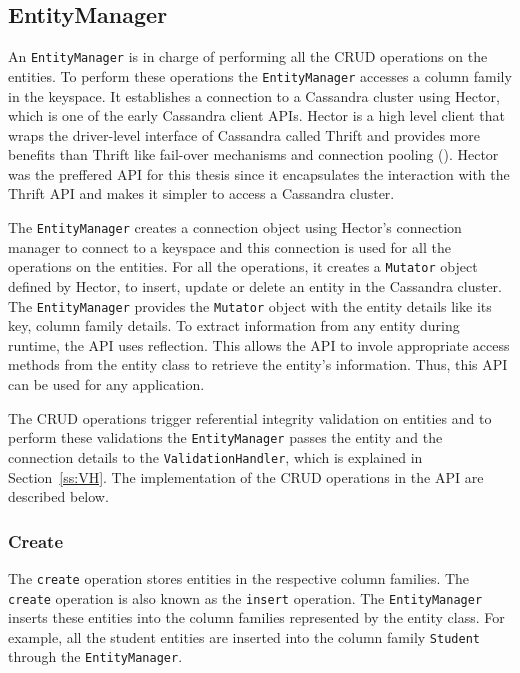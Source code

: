 	\subsection{EntityManager}

	An \texttt{EntityManager} is in charge of performing all the \ac{CRUD}
	operations on the entities. To perform these
	operations  the \texttt{EntityManager}
	accesses a column family in the keyspace. It establishes a connection
	to a Cassandra cluster using Hector, which is one of the 
	 early Cassandra client \acp{API}.  Hector is a high level
	client that wraps the driver-level interface of Cassandra called Thrift and
	provides more benefits than Thrift like fail-over mechanisms and connection
	pooling ().  Hector was the preffered \ac{API} for this thesis
	since it encapsulates the interaction with the Thrift \ac{API} and makes it
	simpler to access a Cassandra cluster.
			
	The \texttt{EntityManager} creates a connection object
	using Hector's  connection manager to connect to a keyspace and this connection
	is used for all the operations on the entities.  For all the operations,
	it creates a \texttt{Mutator} object defined by Hector,  to
	insert,  update or delete an entity in the Cassandra cluster. The
	\texttt{EntityManager} provides the \texttt{Mutator} object with the entity
	details like its key, column family details. To extract  information
	from any entity during runtime, the \ac{API} uses reflection. This allows
	the \ac{API} to invole appropriate access methods from the entity class to
	retrieve the entity's information.
	Thus, this \ac{API} can be used for any application.
 	
	The \ac{CRUD} operations trigger  referential
	integrity validation on entities and to
	perform these validations the \texttt{EntityManager} passes the
	entity and the connection details to the \texttt{ValidationHandler},
	which is explained in Section~\ref{ss:VH}.
	The implementation of the \ac{CRUD} operations in the \ac{API} are described
	below.
	
		\subsubsection{Create}
		 The \texttt{create} operation stores entities in the respective column
		families. The \texttt{create} operation is also known as the
		\texttt{insert} operation. The \texttt{EntityManager} inserts these entities
		into the column families represented by the entity class.  
		For example,  all the student entities are inserted into the column family
		\texttt{Student} through the \texttt{EntityManager}. 
		

